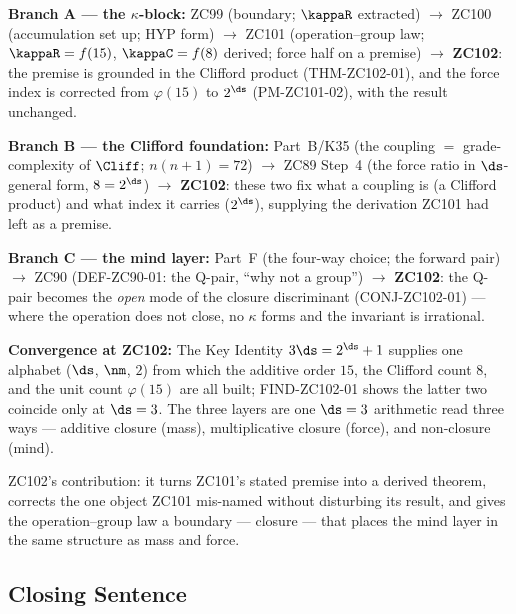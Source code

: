 \documentclass[12pt, a4paper]{article}
\begin{document}
\begin{genealogybox}[title={How ZC102 Sits in the Corpus --- Grounding and Correcting}]
\textbf{Branch A --- the $\kappa$-block:}
ZC99 (boundary; $\kappaR$ extracted) $\to$ ZC100 (accumulation set up; HYP form)
$\to$ ZC101 (operation--group law; $\kappaR=f(15)$, $\kappaC=f(8)$ derived;
force half on a premise) $\to$ \textbf{ZC102}: the premise is grounded in the
Clifford product (THM-ZC102-01), and the force index is corrected from
$\varphi(15)$ to $2^{\ds}$ (PM-ZC101-02), with the result unchanged.

\textbf{Branch B --- the Clifford foundation:}
Part~B/K35 (the coupling $=$ grade-complexity of $\Cliff$; $n(n+1)=72$) $\to$
ZC89 Step~4 (the force ratio in $\ds$-general form, $8=2^{\ds}$) $\to$
\textbf{ZC102}: these two fix what a coupling is (a Clifford product) and what
index it carries ($2^{\ds}$), supplying the derivation ZC101 had left as a
premise.

\textbf{Branch C --- the mind layer:}
Part~F (the four-way choice; the forward pair) $\to$ ZC90 (DEF-ZC90-01: the
Q-pair, ``why not a group'') $\to$ \textbf{ZC102}: the Q-pair becomes the
\emph{open} mode of the closure discriminant (CONJ-ZC102-01) --- where the
operation does not close, no $\kappa$ forms and the invariant is irrational.

\textbf{Convergence at ZC102:}
The Key Identity $3\ds=2^{\ds}+1$ supplies one alphabet ($\ds$, $\nm$, $2$) from
which the additive order $15$, the Clifford count $8$, and the unit count
$\varphi(15)$ are all built; FIND-ZC102-01 shows the latter two coincide only at
$\ds=3$. The three layers are one $\ds=3$ arithmetic read three ways --- additive
closure (mass), multiplicative closure (force), and non-closure (mind).

ZC102's contribution: it turns ZC101's stated premise into a derived theorem,
corrects the one object ZC101 mis-named without disturbing its result, and gives
the operation--group law a boundary --- closure --- that places the mind layer in
the same structure as mass and force.
\end{genealogybox}

\subsection{Closing Sentence}
\end{document}
